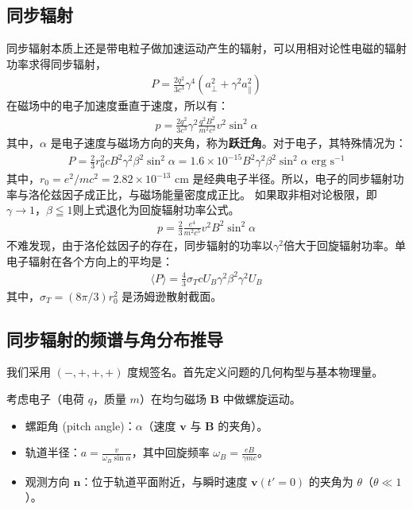     
\subsection{同步辐射}
同步辐射本质上还是带电粒子做加速运动产生的辐射，可以用相对论性电磁的辐射功率求得同步辐射，
\begin{align}
  P = \frac{2q^2}{3c^3}\gamma^4(a_\perp^2 + \gamma^2 a_\parallel^2)
\end{align}
在磁场中的电子加速度垂直于速度，所以有：
\begin{align}
  p = \frac{2q^2}{3c^3}\gamma^2\frac{q^2B^2}{m^2c^2}v^2\sin^2\alpha
\end{align}
其中，$\alpha$ 是电子速度与磁场方向的夹角，称为\textbf{跃迁角}。对于电子，其特殊情况为：
\begin{align}
  P = \frac{2}{3}r_0^{2}cB^2\gamma^2\beta^2\sin^2\alpha = 1.6\times 10^{-15}B^2\gamma^2\beta^2\sin^2\alpha \text{ erg s}^{-1}
\end{align}
其中，$r_0 = e^2/mc^2 = 2.82\times 10^{-13}$ cm 是经典电子半径。所以，电子的同步辐射功率与洛伦兹因子成正比，与磁场能量密度成正比。
如果取非相对论极限，即 $\gamma \to 1$，$\beta \leqq 1$则上式退化为回旋辐射功率公式。
\begin{align}
  p = \frac{2}{3}\frac{e^4}{m^2c^5}v^2B^2\sin^2\alpha
\end{align}
不难发现，由于洛伦兹因子的存在，同步辐射的功率以$\gamma^2$倍大于回旋辐射功率。单电子辐射在各个方向上的平均是：
\begin{align}
  \langle P \rangle = \frac{4}{3}\sigma_T c U_B \gamma^2 \beta^2\gamma^2U_B
\end{align}
其中，$\sigma_T = (8\pi/3)r_0^2$ 是汤姆逊散射截面。

\subsection{同步辐射的频谱与角分布推导}


我们采用 $(-,+,+,+)$ 度规签名。首先定义问题的几何构型与基本物理量。

\begin{definition}[螺旋运动几何]
    考虑电子（电荷 $q$，质量 $m$）在均匀磁场 $\mathbf{B}$ 中做螺旋运动。
    \begin{itemize}
        \item 螺距角 (pitch angle)：$\alpha$（速度 $\mathbf{v}$ 与 $\mathbf{B}$ 的夹角）。
        \item 轨道半径：$a = \frac{v}{\omega_B \sin\alpha}$，其中回旋频率 $\omega_B = \frac{eB}{\gamma mc}$。
        \item 观测方向 $\mathbf{n}$：位于轨道平面附近，与瞬时速度 $\mathbf{v}(t'=0)$ 的夹角为 $\theta$（$\theta \ll 1$）。
    \end{itemize}
\end{definition}

